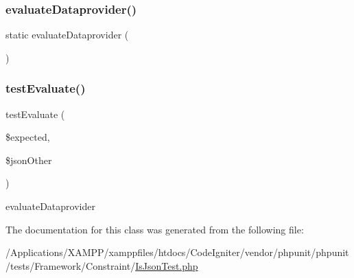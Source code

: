 \subsubsection{\texorpdfstring{evaluate\+Dataprovider()}{evaluateDataprovider()}}
{\footnotesize\ttfamily static evaluate\+Dataprovider (\begin{DoxyParamCaption}{ }\end{DoxyParamCaption})\hspace{0.3cm}{\ttfamily [static]}}

\mbox{\label{class_framework___constraint___is_json_test_adfe8811a148a46bb6ae286ef67f2748b}} 
\subsubsection{\texorpdfstring{test\+Evaluate()}{testEvaluate()}}
{\footnotesize\ttfamily test\+Evaluate (\begin{DoxyParamCaption}\item[{}]{\$expected,  }\item[{}]{\$json\+Other }\end{DoxyParamCaption})}

evaluate\+Dataprovider 

The documentation for this class was generated from the following file\+:\begin{DoxyCompactItemize}
\item 
/\+Applications/\+X\+A\+M\+P\+P/xamppfiles/htdocs/\+Code\+Igniter/vendor/phpunit/phpunit/tests/\+Framework/\+Constraint/\mbox{\hyperlink{_is_json_test_8php}{Is\+Json\+Test.\+php}}\end{DoxyCompactItemize}
